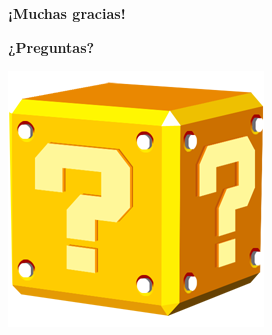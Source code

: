 \documentclass[green]{beamer}
\begin{document}
\begin{frame}
\transdissolve
    \frametitle{}
    
    \begin{center}
	\huge{\textbf{¡Muchas gracias!}}
    \end{center}
    
    \begin{center}
	\textbf{¿Preguntas?}
    \end{center}
    
    \begin{center}
	    \includegraphics[scale=0.25]{img/pregunta.png}
    \end{center}
    
\end{frame}
\end{document}
